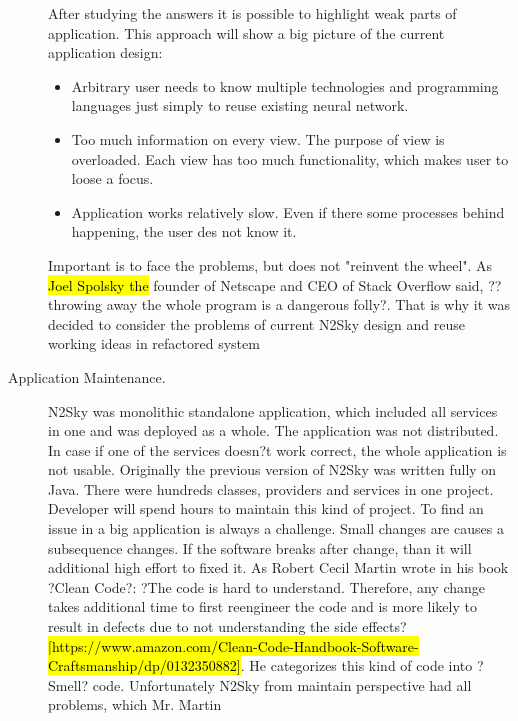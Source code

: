 \begin{description}
After studying the answers it is possible to highlight weak parts of application. This approach will show a big picture of the current application design:

\begin{itemize}
\item Arbitrary user needs to know multiple technologies and programming languages just simply to reuse existing neural network. 
\item Too much information on every view. The purpose of view is overloaded. Each view has too much functionality, which makes user to loose a focus.
\item Application works relatively slow. Even if there some processes behind happening, the user des not know it.
\end{itemize}

Important is to face the problems, but does not "reinvent the wheel".  As \hl{Joel Spolsky the} founder of Netscape and CEO of Stack Overflow said, ??throwing away the whole program is a dangerous folly?. That is why it was decided to consider the problems of current N2Sky design and reuse working ideas in refactored system

\item[Application Maintenance.]
N2Sky was monolithic standalone application, which included all services in one and was deployed as a whole. The application was not distributed.  In case if one of the services doesn?t work correct, the whole application is not usable. 
Originally the previous version of N2Sky was written fully on Java. There were hundreds classes, providers and services in one project. Developer will spend hours to maintain this kind of project. To find an issue in a big application is always a challenge.  Small changes are causes a subsequence changes. If the software breaks after change, than it will additional high effort to fixed it. As Robert Cecil Martin wrote in his book ?Clean Code?: ?The code is hard to understand. Therefore, any change takes additional time to first reengineer the code and is more likely to result in defects due to not understanding the side effects? \hl{[https://www.amazon.com/Clean-Code-Handbook-Software-Craftsmanship/dp/0132350882]}.  He categorizes this kind of code into ?Smell? code. Unfortunately N2Sky from maintain perspective had all problems, which Mr. Martin


\end{description}
